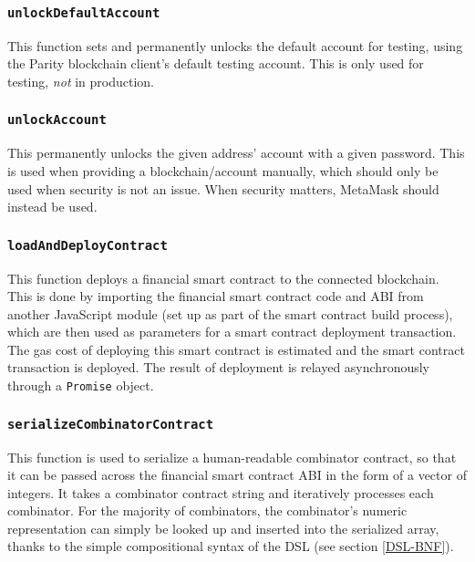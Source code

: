 \subsubsection{\texttt{unlockDefaultAccount}}

This function sets and permanently unlocks the default account for testing, using the Parity blockchain client's default testing account. This is only used for testing, \textit{not} in production.

\subsubsection{\texttt{unlockAccount}}

This permanently unlocks the given address' account with a given password. This is used when providing a blockchain/account manually, which should only be used when security is not an issue. When security matters, MetaMask should instead be used.

\subsubsection{\texttt{loadAndDeployContract}}

This function deploys a financial smart contract to the connected blockchain. This is done by importing the financial smart contract code and ABI from another JavaScript module (set up as part of the smart contract build process), which are then used as parameters for a smart contract deployment transaction. The gas cost of deploying this smart contract is estimated and the smart contract transaction is deployed. The result of deployment is relayed asynchronously through a \texttt{Promise} object.

\subsubsection{\texttt{serializeCombinatorContract}}

This function is used to serialize a human-readable combinator contract, so that it can be passed across the financial smart contract ABI in the form of a vector of integers. It takes a combinator contract string and iteratively processes each combinator. For the majority of combinators, the combinator's numeric representation can simply be looked up and inserted into the serialized array, thanks to the simple compositional syntax of the DSL (see section \ref{DSL-BNF}). \\

